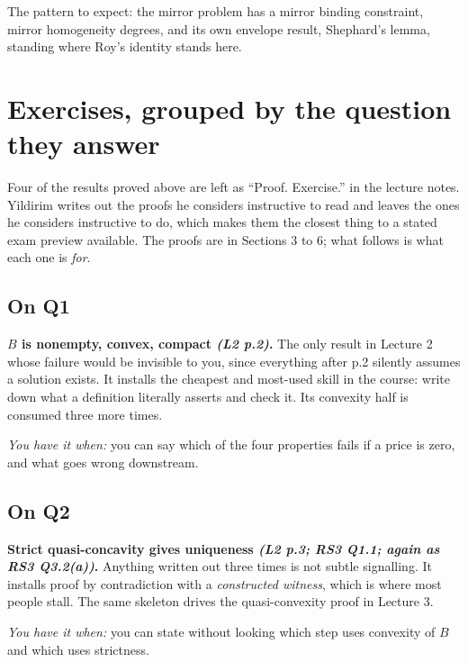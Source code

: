 \documentclass[11pt]{article}
\theoremstyle{definition}
\newcommand{\src}[1]{\textit{\small (#1)}}
\begin{document}
The pattern to expect: the mirror problem has a mirror binding constraint, mirror
homogeneity degrees, and its own envelope result, Shephard's lemma, standing where Roy's
identity stands here.

\clearpage

\section{Exercises, grouped by the question they answer}

Four of the results proved above are left as ``Proof. Exercise.'' in the lecture notes.
Yildirim writes out the proofs he considers instructive to read and leaves the ones he
considers instructive to do, which makes them the closest thing to a stated exam preview
available. The proofs are in Sections 3 to 6; what follows is what each one is \emph{for}.

\subsection{On Q1}

\textbf{$B$ is nonempty, convex, compact \src{L2 p.2}.} The only result in Lecture 2 whose
failure would be invisible to you, since everything after p.2 silently assumes a solution
exists. It installs the cheapest and most-used skill in the course: write down what a
definition literally asserts and check it. Its convexity half is consumed three more times.

\emph{You have it when:} you can say which of the four properties fails if a price is zero,
and what goes wrong downstream.

\subsection{On Q2}

\textbf{Strict quasi-concavity gives uniqueness \src{L2 p.3; RS3 Q1.1; again as RS3
Q3.2(a)}.} Anything written out three times is not subtle signalling. It installs proof by
contradiction with a \emph{constructed witness}, which is where most people stall. The same
skeleton drives the quasi-convexity proof in Lecture 3.

\emph{You have it when:} you can state without looking which step uses convexity of $B$ and
which uses strictness.
\end{document}
